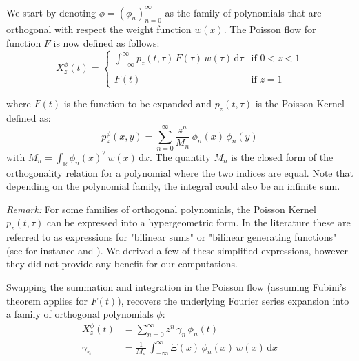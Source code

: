 \documentclass[a4paper,11pt,twoside]{amsart}
\begin{document}
We start by denoting $\phi = \left(\phi_n\right)_{n=0}^\infty$ as the family of polynomials that are orthogonal with respect the weight function $w(x)$. The Poisson flow for function $F$ is now defined as follows:
\begin{equation}\label{poiflow}
X^\phi_z(t)=
    \begin{cases}
        \int_{-\infty}^{\infty} p_z(t, \tau)\,F(\tau)\,w(\tau)\,\mathrm{d}\tau & \text{if } 0 < z < 1\\
        \\
        F(t) & \text{if } z = 1
    \end{cases}
\end{equation}

where $F(t)$ is the function to be expanded and $p_z(t, \tau)$ is the Poisson Kernel defined as:
\begin{equation}\label{poiker}
 p^\phi_z(x,y) = \sum_{n=0}^\infty\frac{z^n}{M_n}\, \phi_n(x)\,\phi_n(y)
\end{equation}
with $M_n = \int_\mathbb{R}\phi_n(x)^2\,w(x)\,\mathrm{d}x$. The quantity $M_n$ is the closed form of the orthogonality relation for a polynomial where the two indices are equal. Note that depending on the polynomial family, the integral could also be an infinite sum.

\textit{Remark:} For some families of orthogonal polynomials, the Poisson Kernel $p_z(t, \tau)$ can be expressed into a hypergeometric form. In the literature these are referred to as expressions for "bilinear sums" or "bilinear generating functions" (see for instance \cite{genoverview} and \cite{meipolgen}). We derived a few of these simplified expressions, however they did not provide any benefit for our computations.

Swapping the summation and integration in the Poisson flow (assuming Fubini's theorem applies for $F(t)$), recovers the underlying Fourier series expansion into a family of orthogonal polynomials $\phi$:
\begin{align}
 X^\phi_z(t) &= \sum_{n=0}^\infty z^n\,\gamma_n\,\phi_n(t) \\
 \gamma_n &= \frac{1}{M_n}\,\int_{-\infty}^\infty \Xi(x)\,\phi_n(x)\,w(x) \,\mathrm{d}x
\end{align}
\end{document}
